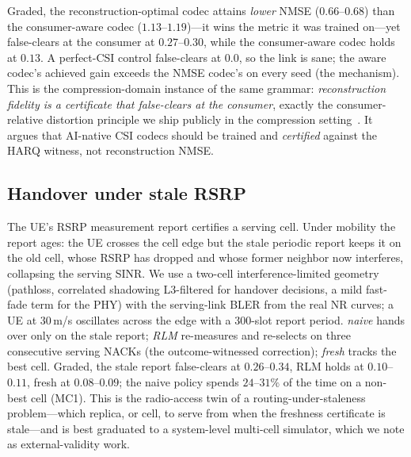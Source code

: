 \documentclass[lettersize,onecolumn]{IEEEtran}
\theoremstyle{remark}
\begin{document}
Graded, the reconstruction-optimal codec attains \emph{lower} NMSE
($0.66$--$0.68$) than the consumer-aware codec ($1.13$--$1.19$)---it wins the
metric it was trained on---yet false-clears at the consumer at $0.27$--$0.30$,
while the consumer-aware codec holds at $0.13$. A perfect-CSI control false-clears
at $0.0$, so the link is sane; the aware codec's achieved gain exceeds the NMSE
codec's on every seed (the mechanism). This is the compression-domain instance of
the same grammar: \emph{reconstruction fidelity is a certificate that false-clears
at the consumer}, exactly the consumer-relative distortion principle we ship
publicly in the compression setting~\cite{bond_turboquant}. It argues that
AI-native CSI codecs should be trained and \emph{certified} against the HARQ
witness, not reconstruction NMSE.

\subsection{Handover under stale RSRP}\label{sec:ho}
The UE's RSRP measurement report certifies a serving cell. Under mobility the
report ages: the UE crosses the cell edge but the stale periodic report keeps it
on the old cell, whose RSRP has dropped and whose former neighbor now interferes,
collapsing the serving SINR. We use a two-cell interference-limited geometry
(pathloss, correlated shadowing L3-filtered for handover decisions, a mild
fast-fade term for the PHY) with the serving-link BLER from the real NR curves; a
UE at $30$\,m/s oscillates across the edge with a $300$-slot report period.
\emph{naive} hands over only on the stale report; \emph{RLM} re-measures and
re-selects on three consecutive serving NACKs (the outcome-witnessed correction);
\emph{fresh} tracks the best cell. Graded, the stale report false-clears at
$0.26$--$0.34$, RLM holds at $0.10$--$0.11$, fresh at $0.08$--$0.09$; the naive
policy spends $24$--$31\%$ of the time on a non-best cell (MC1). This is the
radio-access twin of a routing-under-staleness problem---which replica, or cell,
to serve from when the freshness certificate is stale---and is best graduated to
a system-level multi-cell simulator, which we note as external-validity work.
\end{document}
